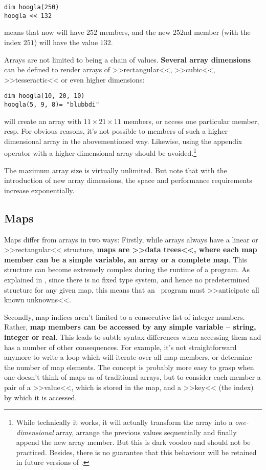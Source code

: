 \begin{lstlisting}
dim hoogla(250)
hoogla << 132
\end{lstlisting}

means that now  will have $252$ members, and the new $252$nd
member (with the index $251$) will have the value $132$.  

Arrays are not limited to being a chain of values. \textbf{Several array
dimensions} can be defined to render arrays of >>rectangular<<, >>cubic<<,
>>tesseractic<< or even higher dimensions:

\begin{lstlisting}
dim hoogla(10, 20, 10)
hoogla(5, 9, 8)= "blubbdi"
\end{lstlisting}

will create an array with $11 \times 21 \times 11$ members, or access
one particular member, resp. For obvious reasons, it's not possible to
 members of such a higher-dimensional array in the
abovementioned way. Likewise, using the appendix operator \Co{$<<$} with
a higher-dimensional array should be avoided.\footnote{While technically
it works, it will actually transform the array into a
\emph{one-dimensional} array, arrange the previous values sequentially
and finally append the new array member. But this is dark voodoo and
should not be practiced. Besides, there is no guarantee that this
behaviour will be retained in future versions of \SB.}

The maximum array size is virtually unlimited. But note that with the
introduction of new array dimensions, the space and performance
requirements increase exponentially.

\subsection{Maps \label{map}}

Maps differ from arrays in two ways: Firstly, while arrays always have a
linear or >>rectangular<< structure, \textbf{maps are >>data trees<<, where each
map member can be a simple variable, an array or a complete map}. This
structure can become extremely complex during the runtime of a program.
As explained in , since there is no fixed type system,
and hence no predetermined structure for any given map, this means that
an \SB\ program must >>anticipate all known unknowns<<.

Secondly, map indices aren't limited to a consecutive list of integer
numbers. Rather, \textbf{map members can be accessed by any simple variable --
string, integer or real}. This leads to subtle syntax differences when
accessing them and has a number of other consequences. For example, it's
not straightforward anymore to write a loop which will iterate over all
map members, or determine the number of map elements. The concept is
probably more easy to grasp when one doesn't think of maps as of
traditional arrays, but to consider each member a pair of a >>value<<,
which is stored in the map, and a >>key<< (the index) by which it is
accessed.

